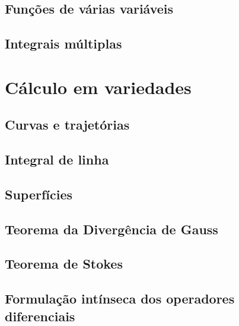 \documentclass[a4paper]{book}
\begin{document}
\chapter{Funções de várias variáveis}

\chapter{Integrais múltiplas}



\part{Cálculo em variedades}

\chapter{Curvas e trajetórias}
\chapter{Integral de linha}
\chapter{Superfícies}
\chapter{Teorema da Divergência de Gauss}
\chapter{Teorema de Stokes}
\chapter{Formulação intínseca dos operadores diferenciais}
















\backmatter





\printindex
\end{document}
